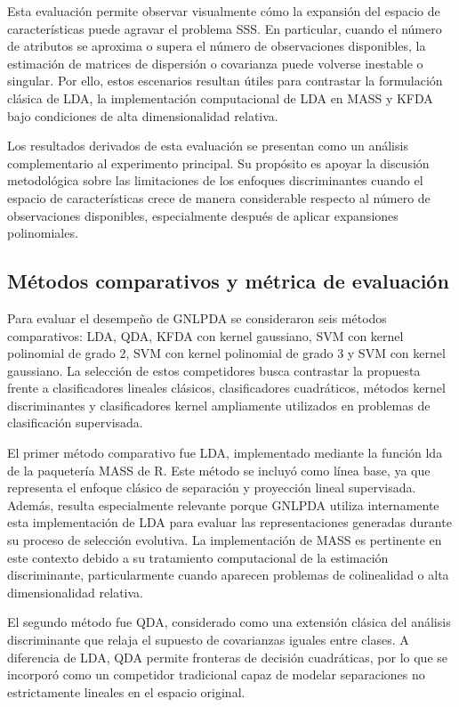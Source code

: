 Esta evaluación permite observar visualmente cómo la expansión del espacio de características puede agravar el problema SSS. En particular, cuando el número de atributos se aproxima o supera el número de observaciones disponibles, la estimación de matrices de dispersión o covarianza puede volverse inestable o singular. Por ello, estos escenarios resultan útiles para contrastar la formulación clásica de LDA, la implementación computacional de LDA en MASS y KFDA bajo condiciones de alta dimensionalidad relativa.

Los resultados derivados de esta evaluación se presentan como un análisis complementario al experimento principal. Su propósito es apoyar la discusión metodológica sobre las limitaciones de los enfoques discriminantes cuando el espacio de características crece de manera considerable respecto al número de observaciones disponibles, especialmente después de aplicar expansiones polinomiales.

\subsection{Métodos comparativos y métrica de evaluación}

Para evaluar el desempeño de GNLPDA se consideraron seis métodos comparativos: LDA, QDA, KFDA con kernel gaussiano, SVM con kernel polinomial de grado 2, SVM con kernel polinomial de grado 3 y SVM con kernel gaussiano. La selección de estos competidores busca contrastar la propuesta frente a clasificadores lineales clásicos, clasificadores cuadráticos, métodos kernel discriminantes y clasificadores kernel ampliamente utilizados en problemas de clasificación supervisada.

El primer método comparativo fue LDA, implementado mediante la función lda de la paquetería MASS de R. Este método se incluyó como línea base, ya que representa el enfoque clásico de separación y proyección lineal supervisada. Además, resulta especialmente relevante porque GNLPDA utiliza internamente esta implementación de LDA para evaluar las representaciones generadas durante su proceso de selección evolutiva. La implementación de MASS es pertinente en este contexto debido a su tratamiento computacional de la estimación discriminante, particularmente cuando aparecen problemas de colinealidad o alta dimensionalidad relativa.

El segundo método fue QDA, considerado como una extensión clásica del análisis discriminante que relaja el supuesto de covarianzas iguales entre clases. A diferencia de LDA, QDA permite fronteras de decisión cuadráticas, por lo que se incorporó como un competidor tradicional capaz de modelar separaciones no estrictamente lineales en el espacio original.


